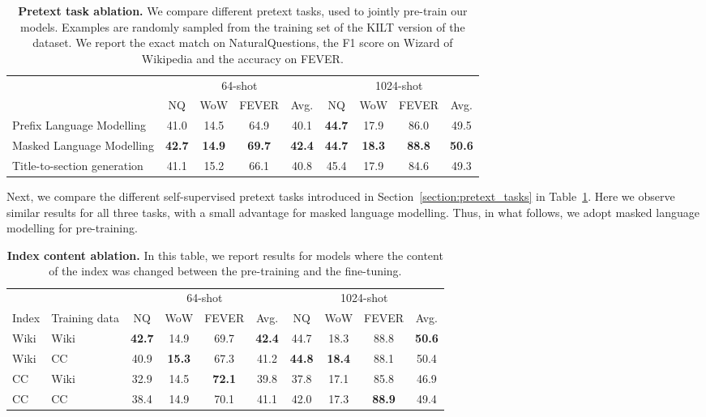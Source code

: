 \documentclass[10pt]{article} \usepackage[preprint]{tmlr}
\begin{document}
\begin{table}
  \centering
  \caption{\textbf{Pretext task ablation.} We compare different pretext tasks, used to jointly pre-train our models. Examples are randomly sampled from the training set of the KILT version of the dataset. We report the exact match on NaturalQuestions, the F1 score on Wizard of Wikipedia and the accuracy on FEVER.}
  \vspace{0.5em}
  \label{table:task_ablation}
  \begin{tabular}{l cccc cccc}
    \toprule
    & \multicolumn{4}{c}{64-shot} & \multicolumn{4}{c}{1024-shot} \\
    \cmidrule(lr){2-5} \cmidrule(lr){6-9}
    & NQ & WoW & FEVER & Avg. & NQ & WoW & FEVER & Avg. \\
    \midrule
    Prefix Language Modelling   & 41.0 & 14.5 & 64.9 & 40.1 & \textbf{44.7} & 17.9 & 86.0 & 49.5 \\
    Masked Language Modelling   & \textbf{42.7} & \textbf{14.9} & \textbf{69.7} & \textbf{42.4} & \textbf{44.7} & \textbf{18.3} & \textbf{88.8} & \textbf{50.6} \\
    Title-to-section generation & 41.1 & 15.2 & 66.1 & 40.8 & 45.4 & 17.9 & 84.6 & 49.3 \\
    \bottomrule
  \end{tabular}
\end{table}

Next, we compare the different self-supervised pretext tasks introduced in Section~\ref{section:pretext_tasks}  in Table~\ref{table:task_ablation}.
Here we observe similar results for all three tasks, with a small advantage for masked language modelling.
Thus, in what follows, we adopt masked language modelling for pre-training.

\begin{table}
  \centering
  \caption{\textbf{Index content ablation.} In this table, we report results for models where the content of the index was changed between the pre-training and the fine-tuning.}
  \vspace{0.5em}
  \label{table:index_content_ablation}
  \begin{tabular}{ll cccc cccc}
    \toprule
    & & \multicolumn{4}{c}{64-shot} & \multicolumn{4}{c}{1024-shot} \\
    \cmidrule(lr){3-6} \cmidrule(lr){7-10}
    Index & Training data & NQ & WoW & FEVER & Avg. & NQ & WoW & FEVER & Avg. \\
    \midrule
    Wiki    & Wiki   & \textbf{42.7} & 14.9 & 69.7 & \textbf{42.4} & 44.7 & 18.3 & 88.8 & \textbf{50.6} \\
    Wiki    & CC     & 40.9 & \textbf{15.3} & 67.3 & 41.2 & \textbf{44.8} & \textbf{18.4} & 88.1 & 50.4 \\
    CC      & Wiki   & 32.9 & 14.5 & \textbf{72.1} & 39.8 & 37.8 & 17.1 & 85.8 & 46.9 \\
    CC      & CC     & 38.4 & 14.9 & 70.1 & 41.1 & 42.0 & 17.3 & \textbf{88.9} & 49.4 \\
    \bottomrule
  \end{tabular}
\end{table}
\end{document}
